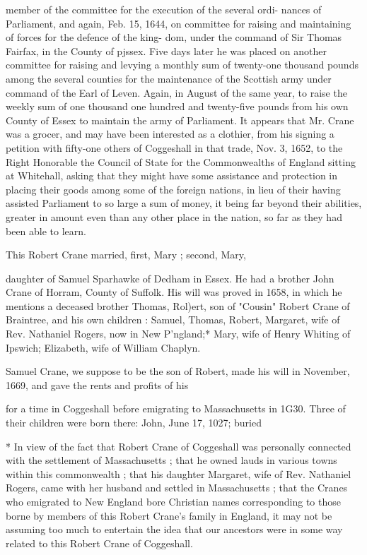 \documentclass{book}
\begin{document}
member of the committee for the execution of the several ordi- 
nances of Parliament, and again, Feb. 15, 1644, on committee 
for raising and maintaining of forces for the defence of the king- 
dom, under the command of Sir Thomas Fairfax, in the County 
of pjssex. Five days later he was placed on another committee 
for raising and levying a monthly sum of twenty-one thousand 
pounds among the several counties for the maintenance of the 
Scottish army under command of the Earl of Leven. Again, in 
August of the same year, to raise the weekly sum of one thousand 
one hundred and twenty-five pounds from his own County of 
Essex to maintain the army of Parliament. It appears that Mr. 
Crane was a grocer, and may have been interested as a clothier, 
from his signing a petition with fifty-one others of Coggeshall in 
that trade, Nov. 3, 1652, to the Right Honorable the Council of 
State for the Commonwealths of England sitting at Whitehall, 
asking that they might have some assistance and protection in 
placing their goods among some of the foreign nations, in lieu of 
their having assisted Parliament to so large a sum of money, it 
being far beyond their abilities, greater in amount even than any 
other place in the nation, so far as they had been able to learn. 

This Robert Crane married, first, Mary ; second, Mary, 

daughter of Samuel Sparhawke of Dedham in Essex. He had a 
brother John Crane of Horram, County of Suffolk. His will was 
proved in 1658, in which he mentions a deceased brother Thomas, 
Rol)ert, son of "Cousin" Robert Crane of Braintree, and his own 
children : Samuel, Thomas, Robert, Margaret, wife of Rev. 
Nathaniel Rogers, now in New P'ngland;* Mary, wife of Henry 
Whiting of Ipswich; Elizabeth, wife of William Chaplyn. 

Samuel Crane, we suppose to be the son of Robert, made his 
will in November, 1669, and gave the rents and profits of his 



for a time in Coggeshall before emigrating to Massachusetts in 1G30. 
Three of their children were born there: John, June 17, 1027; buried 

* In view of the fact that Robert Crane of Coggeshall was personally 
connected with the settlement of Massachusetts ; that he owned lauds in 
various towns within this commonwealth ; that his daughter Margaret, 
wife of Rev. Nathaniel Rogers, came with her husband and settled in 
Massachusetts ; that the Cranes who emigrated to New England bore 
Christian names corresponding to those borne by members of this 
Robert Crane's family in England, it may not be assuming too much to 
entertain the idea that our ancestors were in some way related to this 
Robert Crane of Coggeshall. 
\end{document}
